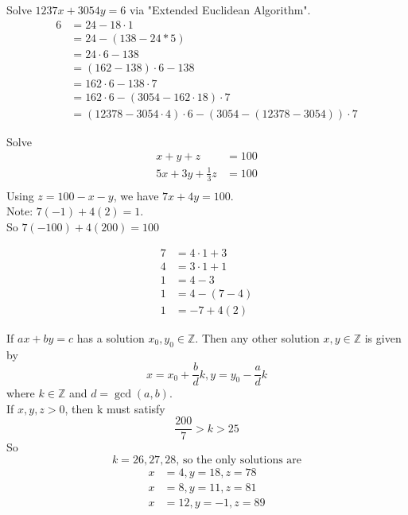    \begin{example}
        Solve $1237x+3054y = 6$ via "Extended Euclidean Algorithm".
        \begin{align*}
            6 & = 24-18\cdot 1 \\
            & = 24-(138-24*5) \\
            & = 24\cdot 6 - 138 \\
            & = (162-138)\cdot 6 - 138 \\
            & = 162\cdot 6 - 138\cdot 7 \\
            & = 162\cdot 6 - (3054-162\cdot 18) \cdot 7 \\
            & = (12378-3054\cdot 4)\cdot 6 - (3054-(12378-3054))\cdot 7
        \end{align*}
    \end{example}
        
    \begin{example}
        Solve
        \begin{align*}
            x+y+z & = 100 \\
            5x+3y+\frac{1}{3}z & = 100 \\
        \end{align*}
        Using $z=100-x-y$, we have $7x+4y = 100$. \\
        Note: $7(-1) + 4(2) = 1$. \\
        So $7(-100) + 4(200) = 100$
        
        \begin{align*}
            7 & = 4\cdot 1 + 3 \\
            4 & = 3\cdot 1 + 1 \\
            1 & = 4-3 \\
            1 & = 4 - (7-4) \\
            1 & = -7 + 4(2)
        \end{align*}
    \end{example}

    \begin{theorem}
        If $ax+by=c$ has a solution $x_0,y_0\in\mathbb{Z}$. Then any other solution
        $x,y\in\mathbb{Z}$ is given by 
        \[
            x=x_0 + \frac{b}{d}k, y = y_0-\frac{a}{d}k        
        \]
        where $k\in\mathbb{Z}$ and $d=\gcd(a,b)$. \\
        If $x,y,z >0$, then k must satisfy
        \[
            \frac{200}{7} > k > 25
        \]
        So
        \[
            k = 26,27,28 \text{, so the only solutions are}
        \]
        \begin{align*}
            x & = 4, y = 18, z = 78 \\
            x & = 8, y = 11, z = 81 \\
            x & = 12, y = -1, z = 89
        \end{align*}
        
    \end{theorem}

